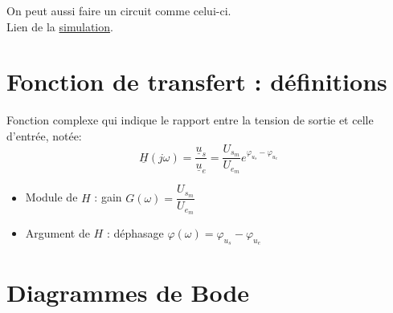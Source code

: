 \documentclass{article}
\begin{document}
{        On peut aussi faire un circuit comme celui-ci.\\
        Lien de la \href{https://www.falstad.com/circuit/circuitjs.html?ctz=CQAgjCAMB0l3BWcBOaAOAbAdgCwCYsBmHMBMHZNQkBSGmuhAUwFowwAoANxB0LxB4EGXv15gRdCLUZQ5MBBwBOogUJEIsI9XLyQOAdxpbxIvgJKTDqwcJCE0OW1aPnT9x+-0APQWjQoSFgI1GCUvOAiAIIAOgDOMgASAF7xAPYAdvEADkwArgAu8VxpAJZK8QCOeUzxADYAhvEFTBlxpZnxACa1cXFpSgWlvUxxRXENBQUAlxl5070AFHN1dUwAlNAcviQBpE4YEuCaEXhOAGKldQVKvQDGaXm58QBGDRk92350xNSEWD8cGZBE4AGrxVo3BZfbBOYhBBBIYgBJxnEDgvoDIZMDh3YzaOyaESEQjAmDwSAQFgIWC7QjIM7IMAkkhQWCUqAcOr4+yknmWeSwCAwMIksBYTA4HBEAFoSABfRGInOEAYNE6RX8o5qpwC-QqHUqw168BwayGnTYNR2TXG7VYCxHfRpOQK3iQcJgOjkoRyULUKR-DhAA}{simulation}.

    }    
    
    \section{Fonction de transfert : définitions}

    Fonction complexe qui indique le rapport entre la tension de sortie et celle d'entrée, notée: 
    $$\underline{H}(j\omega) = \dfrac{\underline{u}_s}{\underline{u}_e} = \dfrac{U_{s_m}}{U_{e_m}} e^{\varphi_{u_s} - \varphi_{u_e}}$$

    \begin{itemize}[label=$\ast$]
        \item Module de $H$ : gain $G(\omega) = \dfrac{U_{s_m}}{U_{e_m}}$
        \item Argument de $H$ : déphasage $\varphi(\omega) = \varphi_{u_s} - \varphi_{u_e}$
    \end{itemize}



    \section{Diagrammes de Bode}

    
\end{document}
